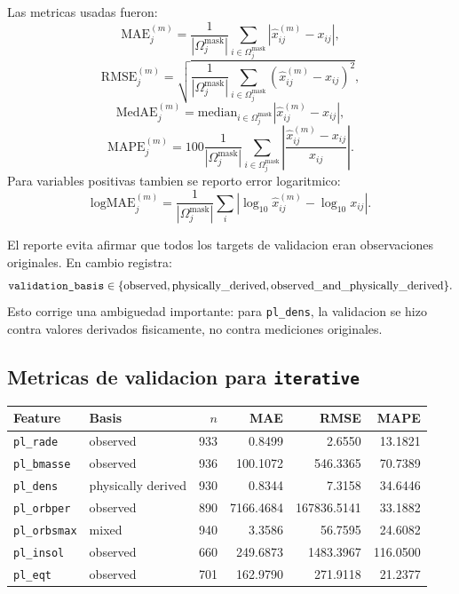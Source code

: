 \documentclass[11pt,letterpaper]{article}
\newcommand{\code}[1]{\ifmmode\text{\texttt{#1}}\else\texttt{#1}\fi}
\newcommand{\method}{\code{iterative}}
\begin{document}
Las metricas usadas fueron:
\[
  \mathrm{MAE}_{j}^{(m)}
  =
  \frac{1}{|\Omega_j^{\mathrm{mask}}|}
  \sum_{i\in\Omega_j^{\mathrm{mask}}}
  \left|\widehat{x}_{ij}^{(m)}-x_{ij}\right|,
\]
\[
  \mathrm{RMSE}_{j}^{(m)}
  =
  \sqrt{
  \frac{1}{|\Omega_j^{\mathrm{mask}}|}
  \sum_{i\in\Omega_j^{\mathrm{mask}}}
  \left(\widehat{x}_{ij}^{(m)}-x_{ij}\right)^2
  },
\]
\[
  \mathrm{MedAE}_{j}^{(m)}
  =
  \mathrm{median}_{i\in\Omega_j^{\mathrm{mask}}}
  \left|
  \widehat{x}_{ij}^{(m)}-x_{ij}
  \right|,
\]
\[
  \mathrm{MAPE}_{j}^{(m)}
  =
  100
  \frac{1}{|\Omega_j^{\mathrm{mask}}|}
  \sum_{i\in\Omega_j^{\mathrm{mask}}}
  \left|
  \frac{\widehat{x}_{ij}^{(m)}-x_{ij}}{x_{ij}}
  \right|.
\]
Para variables positivas tambien se reporto error logaritmico:
\[
  \mathrm{logMAE}_{j}^{(m)}
  =
  \frac{1}{|\Omega_j^{\mathrm{mask}}|}
  \sum_i
  \left|
  \log_{10}\widehat{x}_{ij}^{(m)}
  -
  \log_{10}x_{ij}
  \right|.
\]

El reporte evita afirmar que todos los targets de validacion eran
observaciones originales. En cambio registra:
\[
  \code{validation\_basis}
  \in
  \{\text{observed},\text{physically\_derived},
    \text{observed\_and\_physically\_derived}\}.
\]
Esto corrige una ambiguedad importante: para \code{pl\_dens}, la validacion se
hizo contra valores derivados fisicamente, no contra mediciones originales.

\subsection{Metricas de validacion para \method}

\begin{center}
\begin{tabular}{llrrrr}
\toprule
Feature & Basis & \(n\) & MAE & RMSE & MAPE\\
\midrule
\code{pl\_rade}    & observed & 933 & 0.8499 & 2.6550 & 13.1821\\
\code{pl\_bmasse}  & observed & 936 & 100.1072 & 546.3365 & 70.7389\\
\code{pl\_dens}    & physically derived & 930 & 0.8344 & 7.3158 & 34.6446\\
\code{pl\_orbper}  & observed & 890 & 7166.4684 & 167836.5141 & 33.1882\\
\code{pl\_orbsmax} & mixed & 940 & 3.3586 & 56.7595 & 24.6082\\
\code{pl\_insol}   & observed & 660 & 249.6873 & 1483.3967 & 116.0500\\
\code{pl\_eqt}     & observed & 701 & 162.9790 & 271.9118 & 21.2377\\
\bottomrule
\end{tabular}
\end{center}
\end{document}
